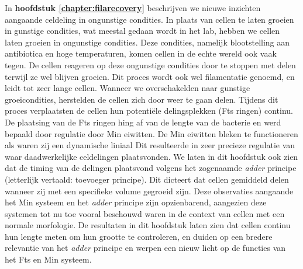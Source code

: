 In \textbf{hoofdstuk \ref{chapter:filarecovery}} beschrijven we nieuwe inzichten aangaande celdeling in ongunstige condities.
%
In plaats van cellen te laten groeien in gunstige condities, wat meestal gedaan wordt in het lab, hebben we cellen laten groeien in ongunstige condities.
%
Deze condities, namelijk blootstelling aan antibiotica en hoge temperaturen, 
komen cellen in de echte wereld ook vaak tegen. 
%
De cellen reageren op deze ongunstige condities door te stoppen met delen terwijl ze wel blijven groeien. 
%
Dit proces wordt ook wel filamentatie genoemd, 
en leidt tot zeer lange cellen.
%
Wanneer we overschakelden naar gunstige groeicondities, 
herstelden de cellen zich door weer te gaan delen.
%
Tijdens dit proces verplaatsten de cellen hun potentiële delingsplekken (Fts ringen) continu.
%
De plaatsing van de Fts ringen hing af van de lengte van de bacterie en werd bepaald door regulatie door Min eiwitten.
%
De Min eiwitten bleken te functioneren als waren zij een dynamische liniaal
%
Dit resulteerde
in zeer precieze regulatie van waar
daadwerkelijke celdelingen plaatsvonden.
%
We laten in dit hoofdstuk ook zien dat de timing van de delingen plaatsvond volgens het zogenaamde \textit{adder} principe (letterlijk vertaald: toevoeger principe). 
Dit dicteert dat cellen gemiddeld delen wanneer zij met een specifieke volume gegroeid zijn.
%
Deze observaties aangaande het Min systeem en het \textit{adder} principe zijn opzienbarend, 
aangezien deze systemen tot nu toe vooral beschouwd waren in de context van cellen met een normale morfologie.
%
De resultaten in dit hoofdstuk laten zien dat \ecoli cellen continu hun lengte meten om hun grootte te controleren,
en duiden op een bredere relevantie van het 
\textit{adder} principe en werpen een nieuw licht  
op de functies van het Fts en Min systeem.




